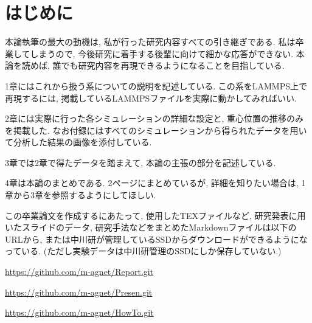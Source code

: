 \chapter*{はじめに}

本論執筆の最大の動機は, 私が行った研究内容すべての引き継ぎである. 私は卒業してしまうので, 今後研究に着手する後輩に向けて細かな応答ができない. 本論を読めば, 誰でも研究内容を再現できるようになることを目指している. 

1章にはこれから扱う系についての説明を記述している. この系をLAMMPS上で再現するには, 掲載しているLAMMPSファイルを実際に動かしてみればいい. 

2章には実際に行った各シミュレーションの詳細な設定と, 重心位置の推移のみを掲載した. なお付録にはすべてのシミュレーションから得られたデータを用いて分析した結果の画像を添付している. 

3章では2章で得たデータを踏まえて, 本論の主張の部分を記述している. 

4章は本論のまとめである. 2ページにまとめているが, 詳細を知りたい場合は, 1章から3章を参照するようにしてほしい. 

この卒業論文を作成するにあたって, 使用したTEXファイルなど, 研究発表に用いたスライドのデータ, 研究手法などをまとめたMarkdownファイルは以下のURLから, または中川研が管理しているSSDからダウンロードができるようになっている. (ただし実験データは中川研管理のSSDにしか保存していない.)

\href{https://github.com/m-agnet/Report.git}{https://github.com/m-agnet/Report.git}

\href{https://github.com/m-agnet/Presen.git}{https://github.com/m-agnet/Presen.git}

\href{https://github.com/m-agnet/HowTo.git}{https://github.com/m-agnet/HowTo.git}